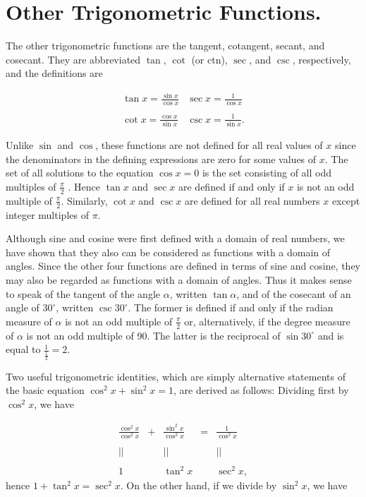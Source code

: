 \section{Other Trigonometric Functions.}
The other trigonometric functions are the tangent, cotangent, secant, and cosecant. They are abbreviated $\tan$, $\cot$ (or ctn), $\sec$, and $\csc$, respectively, and the definitions are

$$
\begin{array}{ll}
\tan x = \frac{\sin x}{\cos x}     &    \sec x = \frac{1}{\cos x}\\
\\
\cot x = \frac{\cos x}{\sin x}     &    \csc x = \frac{1}{\sin x}.
\end{array}
$$
\smallskip

Unlike $\sin$ and $\cos$, these functions are not defined for all real values of $x$ since the
denominators in the defining expressions are zero for some values of $x$. The set of all solutions
to the equation $\cos x = 0$ is the set consisting of all odd multiples of $\frac{\pi}{2}$ . 
Hence $\tan x$ and $\sec x$ are defined if and only if $x$ is not an odd multiple of $\frac{\pi}{2}$. Similarly, $\cot x$ and $\csc x$ are defined for all real numbers $x$ except integer multiples of $\pi$.

Although sine and cosine were first defined with a domain of real numbers, we have shown that
they also can be considered as functions with a domain of angles. Since the other four functions
are defined in terms of sine and cosine, they may also be regarded as functions with a domain of
angles. Thus it makes sense to speak of the tangent of the angle $\alpha$, written $\tan \alpha$, 
and of the cosecant of an angle of $30^{\circ}$, written $\csc 30^{\circ}$. The former is defined if 
and only if the radian measure of $\alpha$ is not an odd multiple of $\frac{\pi}{2}$ or, alternatively, 
if the degree measure of $\alpha$ is not an odd multiple of 90. The latter is the reciprocal of 
$\sin 30^{\circ}$ and is equal to $\frac{1}{\frac{1}{2}} = 2$.

Two useful trigonometric identities, which are simply alternative statements of the basic equation $\cos^{2}x + \sin^{2}x = 1$, are derived as follows:
Dividing first by $\cos^{2}x$, we have 

$$
\begin{array}{ccccc}
\frac{\cos^{2}x}{\cos^{2} x} &+& \frac{ \sin^{2} x }{\cos ^{2} x} &=& \frac{1}{\cos^{2}{x}}\\ 
\\
          ||                               &  &                     ||                         & &                    ||\\
\\
          1                               &  &               \tan^{2} x                  & &             \sec^{2}x, 
\end{array}
$$
\noindent hence $1 + \tan^{2}x = \sec^{2}x$. On the other hand, if we divide by $\sin^{2}x$, we have


